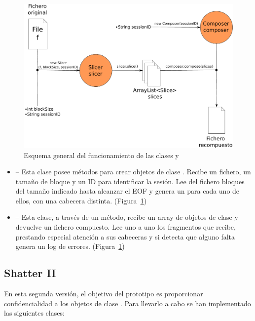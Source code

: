 \begin{figure}[!htb]
  \centering
  \includegraphics[scale=0.5]{Figures/Assembler}
  \decoRule
  \caption[ - ]{Esquema general del funcionamiento de las clases  y }
  \label{fig:Assembler}
\end{figure}

\begin{itemize}
  \item {} -- Esta clase posee métodos para crear objetos de clase . Recibe un fichero, un tamaño de bloque y un ID para identificar la sesión. Lee del fichero bloques del tamaño indicado hasta alcanzar el EOF y genera un  para cada uno de ellos, con una cabecera distinta. (Figura~\ref{fig:Assembler})

  \item {} -- Esta clase, a través de un método, recibe un array de objetos de clase  y devuelve un fichero compuesto. Lee uno a uno los fragmentos que recibe, prestando especial atención a sus cabeceras y si detecta que alguno falta genera un log de errores. (Figura~\ref{fig:Assembler})
\end{itemize}

\subsection{Shatter II}

En esta segunda versión, el objetivo del prototipo es proporcionar confidencialidad a los objetos de clase . Para llevarlo a cabo se han implementado las siguientes clases:

